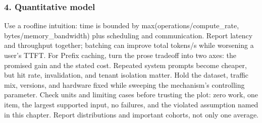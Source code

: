 \subsubsection*{4. Quantitative model}
Use a roofline intuition: time is bounded by max(operations/compute\_rate, bytes/memory\_bandwidth) plus scheduling and communication. Report latency and throughput together; batching can improve total tokens/s while worsening a user's TTFT.
For Prefix caching, turn the prose tradeoff into two axes: the promised gain and the stated cost. Repeated system prompts become cheaper, but hit rate, invalidation, and tenant isolation matter. Hold the dataset, traffic mix, versions, and hardware fixed while sweeping the mechanism's controlling parameter.
Check units and limiting cases before trusting the plot: zero work, one item, the largest supported input, no failures, and the violated assumption named in this chapter. Report distributions and important cohorts, not only one average.
